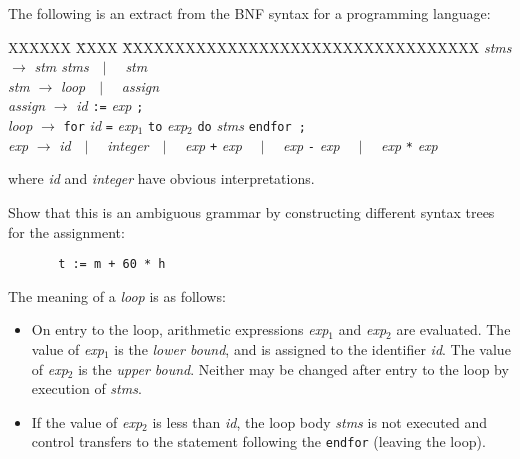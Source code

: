 \begin{questions}

\question

\newenvironment{bnf}{
    \begin{tabbing}
    XXXXXX \= XXXX \= XXXXXXXXXXXXXXXXXXXXXXXXXXXXXXXXXX\kill}{
    \end{tabbing}
    }

\newcommand{\nt}[1]{{\it #1\/}}
\newcommand{\Or}[1]{\ \ $|$ \ \ #1}
\newcommand{\Rule}[2]{{\it #1} \> $\rightarrow$ \> #2}


The following is an extract from the BNF syntax for
a programming language:
\begin{bnf}
\Rule{\nt{stms}}{\nt{stm stms}\Or{\nt{stm}}} \\
\Rule{\nt{stm}}{\nt{loop}\Or{\nt{assign}}} \\
\Rule{\nt{assign}}{\nt{id} \verb":=" \nt{exp} \verb";"} \\
\Rule{\nt{loop}}{\verb"for" \nt{id} \verb"=" \nt{exp$_1$} \verb"to" \nt{exp$_2$}
 \verb"do" \nt{stms} \verb"endfor ;"} \\
\Rule{\nt{exp}}{\nt{id}\Or{\nt{integer}}\Or{\nt{exp} \verb"+" \nt{exp}}
        \Or{\nt{exp} \verb"-" \nt{exp}} \Or{\nt{exp} \verb"*" \nt{exp}}}
\end{bnf}
where \nt{id} and \nt{integer} have obvious interpretations.
\begin{subquestions}
\subsubquestion
Show that this is an ambiguous grammar by constructing different
syntax trees for the assignment:
\begin{verbatim}
       t := m + 60 * h
\end{verbatim}
\subquestion
The meaning of a \nt{loop} is as follows:
\begin{itemize}
\item On entry to the loop, arithmetic expressions \nt{exp$_1$} and \nt{exp$_2$}
        are evaluated. The value of \nt{exp$_1$} is the {\em lower
        bound}, and is assigned to the identifier \nt{id}.
        The value of \nt{exp$_2$} is the {\em upper bound}.
        Neither may be changed after entry to the loop by 
        execution of \nt{stms}.
\item If the value of \nt{exp$_2$} is less than \nt{id},
        the loop body \nt{stms} is
        not executed and control transfers to the statement following
        the \verb"endfor" (leaving the loop).

\end{itemize}
\end{subquestions}
\end{questions}
